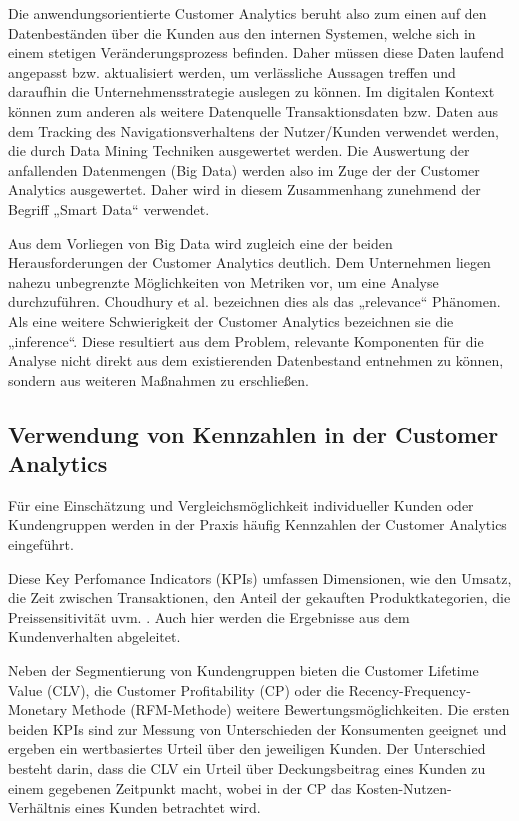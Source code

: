 Die anwendungsorientierte Customer Analytics beruht also zum einen auf den Datenbeständen über die Kunden aus den internen Systemen, welche sich in einem stetigen Veränderungsprozess befinden. Daher müssen diese Daten laufend angepasst bzw. aktualisiert werden, um verlässliche Aussagen treffen und daraufhin die Unternehmensstrategie auslegen zu können. Im digitalen Kontext können zum anderen als weitere Datenquelle Transaktionsdaten bzw. Daten aus dem Tracking des Navigationsverhaltens der Nutzer/Kunden verwendet werden, die durch Data Mining Techniken ausgewertet werden. Die Auswertung der anfallenden Datenmengen (Big Data) werden also im Zuge der der Customer Analytics ausgewertet. Daher wird in diesem Zusammenhang zunehmend der Begriff „Smart Data“ verwendet.

Aus dem Vorliegen von Big Data wird zugleich eine der beiden Herausforderungen der Customer Analytics \cite{choudhury2010} deutlich. Dem Unternehmen liegen nahezu unbegrenzte Möglichkeiten von Metriken vor, um eine Analyse durchzuführen. Choudhury et al. \cite{choudhury2010} bezeichnen dies als das „relevance“ Phänomen. Als eine weitere Schwierigkeit der Customer Analytics bezeichnen sie die „inference“. Diese resultiert aus dem Problem, relevante Komponenten für die Analyse nicht direkt aus dem existierenden Datenbestand entnehmen zu können, sondern aus weiteren Maßnahmen zu erschließen.

\subsection{Verwendung von Kennzahlen in der Customer Analytics}
Für eine Einschätzung und Vergleichsmöglichkeit individueller Kunden oder Kundengruppen werden in der Praxis häufig Kennzahlen der Customer Analytics eingeführt.

Diese Key Perfomance Indicators (KPIs) umfassen Dimensionen, wie den Umsatz, die Zeit zwischen Transaktionen, den Anteil der gekauften Produktkategorien, die Preissensitivität uvm. \cite{grigsby2016}. Auch hier werden die Ergebnisse aus dem Kundenverhalten abgeleitet.

Neben der Segmentierung von Kundengruppen bieten die Customer Lifetime Value (CLV), die Customer Profitability (CP) oder die Recency-Frequency-Monetary Methode (RFM-Methode) weitere Bewertungsmöglichkeiten. Die ersten beiden KPIs sind zur Messung von Unterschieden der Konsumenten geeignet \cite{pfeifer2005} und ergeben ein wertbasiertes Urteil über den jeweiligen Kunden.
Der Unterschied besteht darin, dass die CLV ein Urteil über Deckungsbeitrag eines Kunden zu einem gegebenen Zeitpunkt macht, wobei in der CP das Kosten-Nutzen-Verhältnis eines Kunden betrachtet wird.

